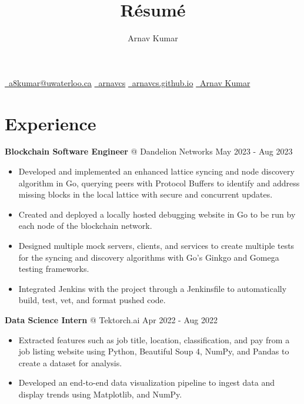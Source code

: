 \documentclass{article}
\makeatletter
\newcommand{\smallbullet}{\,\begin{picture}(-1,1)(-1,-3)\circle*{3}\end{picture}\ }
\renewcommand{\maketitle}{
    \begin{center}
    {\color{MyBlue3}\Huge\bfseries
        \theauthor
    }

    \vspace{0.1em}
    {
        \href{mailto:a8kumar@uwaterloo.ca}{\faEnvelope \ a8kumar@uwaterloo.ca} \quad
        \href{https://github.com/arnavcs}{\faGithub \ arnavcs} \quad
        \href{https://arnavcs.github.io/}{\faGlobe \ arnavcs.github.io} \quad
        \href{https://www.linkedin.com/in/arnav-kumar-0644881a3/}{\faLinkedin \ Arnav Kumar}
    }
    \vspace{-1em}
    \end{center}
}
\newenvironment{resumeItem}
{
    \vspace{0.5em}
}
{
}
\newcommand{\experienceHead}[4]{
    \textbf{#1} @ #2 \hfill #3 \\[-1.2em]
}
\newenvironment{resumeList}
{
    \begin{itemize}[label=\smallbullet]
}
{
    \end{itemize}
}
\makeatother
\begin{document}
\title{R\'esum\'e}
\author{Arnav Kumar}

\maketitle


\section{Experience}

\begin{resumeItem}
\experienceHead{Blockchain Software Engineer}{Dandelion Networks}{May 2023 - Aug 2023}{Online}
\begin{resumeList}
    \item Developed and implemented an enhanced lattice syncing and node discovery algorithm in Go, querying peers with Protocol Buffers to identify and address missing blocks in the local lattice with secure and concurrent updates.
    \item Created and deployed a locally hosted debugging website in Go to be run by each node of the blockchain network.
    \item Designed multiple mock servers, clients, and services to create multiple tests for the syncing and discovery algorithms with Go's Ginkgo and Gomega testing frameworks.
    \item Integrated Jenkins with the project through a Jenkinsfile to automatically build, test, vet, and format pushed code.
\end{resumeList}
\end{resumeItem}

\begin{resumeItem}
\experienceHead{Data Science Intern}{Tektorch.ai}{Apr 2022 - Aug 2022}{Online}
\begin{resumeList}
    \item Extracted features such as job title, location, classification, and pay from a job listing website using Python, Beautiful Soup 4, NumPy, and Pandas to create a dataset for analysis. 
    \item Developed an end-to-end data visualization pipeline to ingest data and display trends using Matplotlib, and NumPy.
\end{resumeList}
\end{resumeItem}

\end{document}
